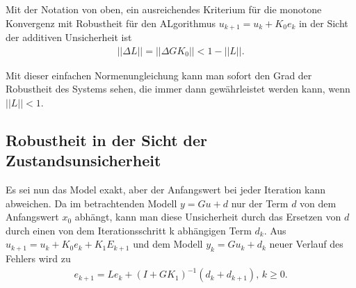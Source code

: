 \begin{theorem}
	
	Mit der Notation von oben, ein ausreichendes Kriterium für die monotone Konvergenz mit Robustheit für den ALgorithmus $u_{k+1} = u_k + K_0 e_k$ in der Sicht der additiven Unsicherheit ist 
	\begin{align}
	||\Delta L || = ||\Delta G K_0||< 1 - ||L||.
	\end{align}
\end{theorem} 

Mit dieser einfachen Normenungleichung kann man sofort den Grad der Robustheit des Systems sehen, die immer dann gewährleistet werden kann, wenn $|| L || < 1$. 

\subsection{Robustheit in der Sicht der Zustandsunsicherheit}

Es sei nun das Model exakt, aber der Anfangswert bei jeder Iteration kann abweichen. Da im betrachtenden Modell $y = G u + d$ nur der Term $d$ von dem Anfangswert $x_0$ abhängt, kann man diese Unsicherheit durch das Ersetzen von $d$ durch einen von dem Iterationsschritt k abhängigen Term $d_k$. Aus $u_{k+1} = u_k + K_0 e_k + K_1 E_{k+1}$ und dem Modell $y_k = G u_k + d_k$ neuer Verlauf des Fehlers wird zu 
\begin{align}
e_{k+1} = L e_k + (I + G K_1)^{-1} (d_k + d_{k+1}), \, k\geq 0.
\end{align}